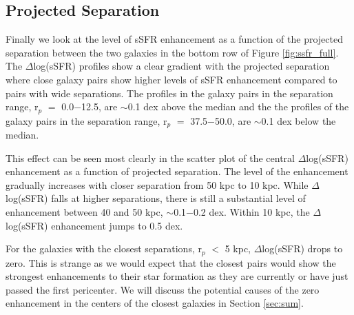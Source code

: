 \documentclass[iop,revtex4,twocolumn,apj,numberedappendix,appendixfloats]{emulateapj}
\begin{document}
\subsection{Projected Separation}

Finally we look at the level of sSFR enhancement as a function of the projected separation between the two galaxies in the bottom row of Figure \ref{fig:ssfr_full}. The $\Delta$log(sSFR) profiles show a clear gradient with the projected separation where close galaxy pairs show higher levels of sSFR enhancement compared to pairs with wide separations. The profiles in the galaxy pairs in the separation range, r$_p$ $=$ 0.0$-$12.5, are $\sim$0.1 dex above the median and the the profiles of the galaxy pairs in the separation range, r$_p$ $=$ 37.5$-$50.0, are $\sim$0.1 dex below the median. 

This effect can be seen most clearly in the scatter plot of the central $\Delta$log(sSFR) enhancement as a function of projected separation. The level of the enhancement gradually increases with closer separation from 50 kpc to 10 kpc. While $\Delta$log(sSFR) falls at higher separations, there is still a substantial level of enhancement between 40 and 50 kpc, $\sim$0.1$-$0.2 dex. Within 10 kpc, the $\Delta$log(sSFR) enhancement jumps to 0.5 dex. 

For the galaxies with the closest separations, r$_p$ $<$ 5 kpc, $\Delta$log(sSFR) drops to zero. This is strange as we would expect that the closest pairs would show the strongest enhancements to their star formation as they are currently or have just passed the first pericenter. We will discuss the potential causes of the zero enhancement in the centers of the closest galaxies in Section \ref{sec:sum}.
\end{document}
